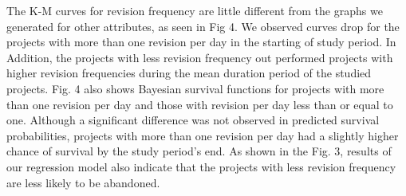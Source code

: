 \documentclass[acmconf]{acmart}
\begin{document}
The K-M curves for revision frequency are little different from the graphs we generated for other attributes, as seen in Fig 4. 
We observed curves drop for the projects with more than one revision per day in the starting of study period.
In Addition, the projects with less revision frequency out performed projects with higher revision frequencies during the mean duration period of the studied projects.
Fig. 4 also shows Bayesian survival functions for projects with more than one revision per day and those with revision per day less than or equal to one. Although a significant difference was not observed in predicted survival probabilities, projects with more than one revision per day had a slightly higher chance of survival by the study period's end.
As shown in the Fig. 3, results of our regression model also indicate that the projects with less revision frequency are less likely to be abandoned. 
\end{document}
